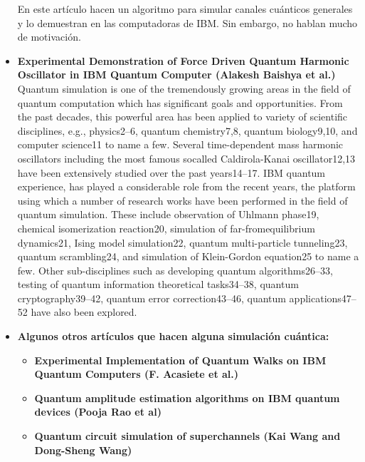 \documentclass[10pt,letterpaper]{article} %
\begin{document}
\begin{itemize}
En este artículo hacen un algoritmo para simular canales cuánticos generales y lo demuestran en las computadoras de IBM. Sin embargo, no hablan mucho de motivación. \\

\item \textbf{Experimental Demonstration of Force Driven Quantum Harmonic Oscillator in IBM
Quantum Computer (Alakesh Baishya et al.)} \\

Quantum simulation is one of the tremendously growing areas in the field of quantum computation which
has significant goals and opportunities. From the
past decades, this powerful area has been applied to
variety of scientific disciplines, e.g., physics2–6, quantum chemistry7,8, quantum biology9,10, and computer
science11 to name a few. Several time-dependent mass
harmonic oscillators including the most famous socalled Caldirola-Kanai oscillator12,13 have been extensively studied over the past years14–17. IBM quantum
experience, has played a considerable role from the recent years, the platform using which a number of research
works have been performed in the field of quantum simulation. These include observation of Uhlmann phase19, chemical isomerization reaction20, simulation of far-fromequilibrium dynamics21, Ising model simulation22, quantum multi-particle tunneling23, quantum scrambling24, and simulation of Klein-Gordon equation25 to name a
few. Other sub-disciplines such as developing quantum
algorithms26–33, testing of quantum information theoretical tasks34–38, quantum cryptography39–42, quantum error correction43–46, quantum applications47–52 have also
been explored.

\item \textbf{Algunos otros art\'iculos que hacen alguna simulaci\'on cu\'antica:}

\begin{itemize}
\item \textbf{Experimental Implementation of Quantum Walks on
IBM Quantum Computers (F. Acasiete et al.)} 


\item  \textbf{Quantum amplitude estimation algorithms on IBM quantum
devices (Pooja Rao et al)}



\item \textbf{Quantum circuit simulation of superchannels (Kai Wang and Dong-Sheng Wang)} \\
\end{itemize}



\end{itemize}
\end{document}
